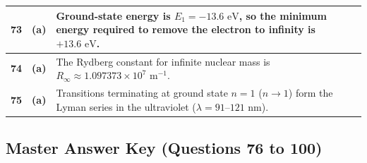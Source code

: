 {\begin{tabularx}{\textwidth}{|c|c|X|}
\textbf{73} & \textbf{(a)} & Ground-state energy is $E_1 = -13.6\text{ eV}$, so the minimum energy required to remove the electron to infinity is $+13.6\text{ eV}$. \\ \hline
\textbf{74} & \textbf{(a)} & The Rydberg constant for infinite nuclear mass is $R_\infty \approx 1.097373 \times 10^7\text{ m}^{-1}$. \\ \hline
\textbf{75} & \textbf{(a)} & Transitions terminating at ground state $n=1$ ($n \to 1$) form the Lyman series in the ultraviolet ($\lambda = 91\text{--}121\text{ nm}$). \\ \hline
\end{tabularx}
}

\newpage

\subsection*{Master Answer Key (Questions 76 to 100)}

